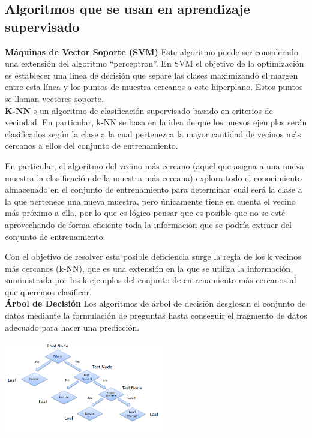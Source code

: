 \documentclass[%
 reprint,
 amsmath,amssymb,
 aps,
]{revtex4-1}
\begin{document}
\subsection{Algoritmos que se usan en aprendizaje supervisado}	
 \textbf{Máquinas de Vector Soporte (SVM)}
Este algoritmo puede ser considerado una extensión del algoritmo “perceptron”. En SVM el objetivo de la optimización es establecer una línea de decisión que separe las clases maximizando el margen entre esta línea y los puntos de muestra cercanos a este hiperplano. Estos puntos se llaman vectores soporte.\\

\textbf{K-NN}
s un algoritmo de clasificación supervisado basado en criterios de vecindad. En particular, k-NN se basa en la idea de que los nuevos ejemplos serán clasificados según la clase a la cual pertenezca la mayor cantidad de vecinos más cercanos a ellos del conjunto de entrenamiento.

En particular, el algoritmo del vecino más cercano (aquel que asigna a una nueva muestra la clasificación de la muestra más cercana) explora todo el conocimiento almacenado en el conjunto de entrenamiento para determinar cuál será la clase a la que pertenece una nueva muestra, pero únicamente tiene en cuenta el vecino más próximo a ella, por lo que es lógico pensar que es posible que no se esté aprovechando de forma eficiente toda la información que se podría extraer del conjunto de entrenamiento.

Con el objetivo de resolver esta posible deficiencia surge la regla de los k vecinos más cercanos (k-NN), que es una extensión en la que se utiliza la información suministrada por los k ejemplos del conjunto de entrenamiento más cercanos al que queremos clasificar.\\
\textbf{Árbol de Decisión}
Los algoritmos de árbol de decisión desglosan el conjunto de datos mediante la formulación de preguntas hasta conseguir el fragmento de datos adecuado para hacer una predicción.

 \begin{center}
\includegraphics[width=7cm]{./Imagenes/arbol}
\end{center}
\end{document}
